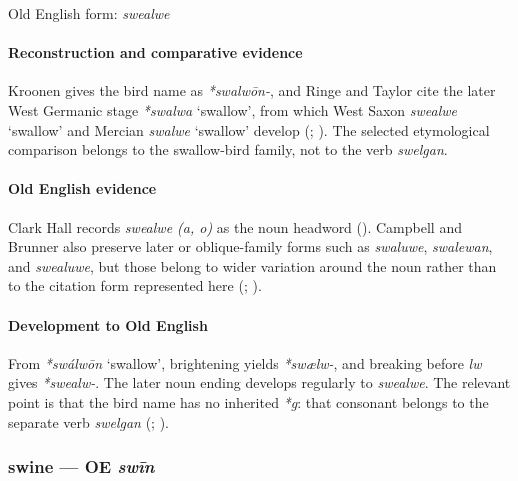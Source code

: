 \documentclass[
  british,
  a4paper,
]{article}
\providecommand{\Recon}[1]{\emph{*#1}}
\begin{document}
Old English form: \emph{swealwe}

\paragraph{Reconstruction and comparative
evidence}\label{reconstruction-and-comparative-evidence-61}

Kroonen gives the bird name as \emph{*swalwōn-}, and Ringe and Taylor
cite the later West Germanic stage \Recon{swalwa} `swallow', from which
West Saxon {\emph{swealwe}} `swallow' and Mercian {\emph{swalwe}}
`swallow' develop (;
). The
selected etymological comparison belongs to the swallow-bird family, not
to the verb \emph{swelgan}.

\paragraph{Old English evidence}\label{old-english-evidence-63}

Clark Hall records \emph{swealwe (a, o)} as the noun headword
(). Campbell and Brunner
also preserve later or oblique-family forms such as \emph{swaluwe},
\emph{swalewan}, and \emph{swealuwe}, but those belong to wider
variation around the noun rather than to the citation form represented
here (;
).

\paragraph{Development to Old
English}\label{development-to-old-english-62}

From \Recon{swálwōn} `swallow', brightening yields \emph{*swælw-}, and
breaking before \emph{lw} gives \emph{*swealw-}. The later noun ending
develops regularly to \emph{swealwe}. The relevant point is that the
bird name has no inherited \emph{*g}: that consonant belongs to the
separate verb \emph{swelgan} (; ).

\subsubsection{\texorpdfstring{swine --- OE
\emph{swīn}}{swine --- OE swīn}}\label{swine-oe-swux12bn}
\end{document}
